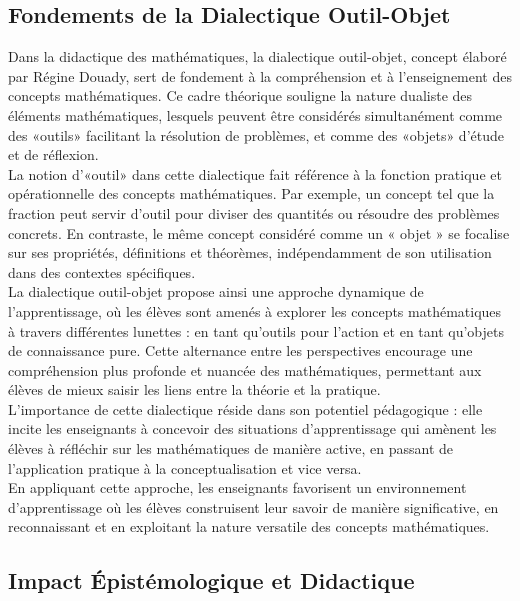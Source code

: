 \subsection{Fondements de la Dialectique Outil-Objet}

Dans la didactique des mathématiques,
la dialectique outil-objet,
concept élaboré par Régine Douady,
sert de fondement à la compréhension et à l'enseignement des concepts mathématiques.
Ce cadre théorique souligne la nature dualiste des éléments mathématiques,
lesquels peuvent être considérés simultanément comme des «outils» facilitant la résolution de problèmes,
et comme des «objets» d'étude et de réflexion.\\

La notion d'«outil» dans cette dialectique fait référence à la fonction pratique et opérationnelle des concepts mathématiques.
Par exemple,
un concept tel que la fraction peut servir d'outil pour diviser des quantités ou résoudre des problèmes concrets.
En contraste,
le même concept considéré comme un « objet » se focalise sur ses propriétés,
définitions et théorèmes,
indépendamment de son utilisation dans des contextes spécifiques.\\

La dialectique outil-objet propose ainsi une approche dynamique de l'apprentissage,
où les élèves sont amenés à explorer les concepts mathématiques à travers différentes lunettes :
en tant qu'outils pour l'action et en tant qu'objets de connaissance pure.
Cette alternance entre les perspectives encourage une compréhension plus profonde et nuancée des mathématiques,
permettant aux élèves de mieux saisir les liens entre la théorie et la pratique.\\

L'importance de cette dialectique réside dans son potentiel pédagogique :
elle incite les enseignants à concevoir des situations d'apprentissage qui amènent les élèves à réfléchir sur les mathématiques de manière active,
en passant de l'application pratique à la conceptualisation et vice versa.\\
En appliquant cette approche,
les enseignants favorisent un environnement d'apprentissage où les élèves construisent leur savoir de manière significative,
en reconnaissant et en exploitant la nature versatile des concepts mathématiques.

\subsection{Impact Épistémologique et Didactique}

